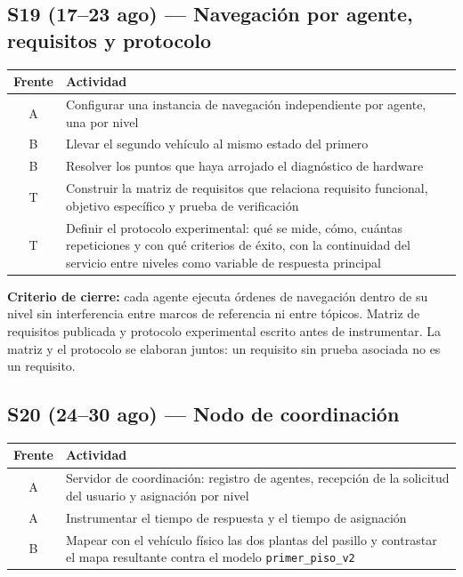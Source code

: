 \documentclass[12pt,letterpaper]{article}
\begin{document}
\subsection{S19 (17--23 ago) --- Navegación por agente, requisitos y protocolo}

\begin{table}[H]
    \centering
    \small
    \begin{tabular}{@{}cp{12.8cm}@{}}
        \toprule
        \textbf{Frente} & \textbf{Actividad} \\ \midrule
        A & Configurar una instancia de navegación independiente por agente, una por nivel \\
        B & Llevar el segundo vehículo al mismo estado del primero \\
        B & Resolver los puntos que haya arrojado el diagnóstico de hardware \\
        T & Construir la matriz de requisitos que relaciona requisito funcional, objetivo específico y prueba de verificación \\
        T & Definir el protocolo experimental: qué se mide, cómo, cuántas repeticiones y con qué criterios de éxito, con la continuidad del servicio entre niveles como variable de respuesta principal \\ \bottomrule
    \end{tabular}
\end{table}

\textbf{Criterio de cierre:} cada agente ejecuta órdenes de navegación dentro de su nivel sin interferencia entre marcos de referencia ni entre tópicos. Matriz de requisitos publicada y protocolo experimental escrito antes de instrumentar. La matriz y el protocolo se elaboran juntos: un requisito sin prueba asociada no es un requisito.

\subsection{S20 (24--30 ago) --- Nodo de coordinación}

\begin{table}[H]
    \centering
    \small
    \begin{tabular}{@{}cp{12.8cm}@{}}
        \toprule
        \textbf{Frente} & \textbf{Actividad} \\ \midrule
        A & Servidor de coordinación: registro de agentes, recepción de la solicitud del usuario y asignación por nivel \\
        A & Instrumentar el tiempo de respuesta y el tiempo de asignación \\
        B & Mapear con el vehículo físico las dos plantas del pasillo y contrastar el mapa resultante contra el modelo \texttt{primer\_piso\_v2} \\ \bottomrule
    \end{tabular}
\end{table}
\end{document}
